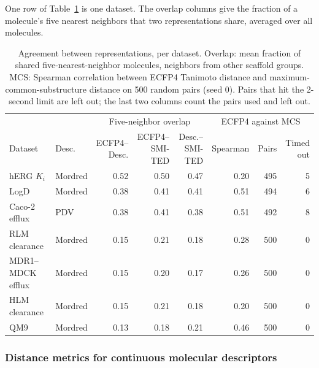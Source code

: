 One row of Table~\ref{tab:flaws:neighbor_overlap} is one dataset. The overlap columns give the fraction of a molecule's five nearest neighbors that two representations share, averaged over all molecules.

\begin{table}[t]
\centering
\small
\setlength{\tabcolsep}{4pt}
\caption[Agreement between representations per dataset.]{Agreement between representations, per dataset. Overlap: mean fraction of shared five-nearest-neighbor molecules, neighbors from other scaffold groups. MCS: Spearman correlation between ECFP4 Tanimoto distance and maximum-common-substructure distance on 500 random pairs (seed 0). Pairs that hit the 2-second limit are left out; the last two columns count the pairs used and left out.}
\label{tab:flaws:neighbor_overlap}
\begin{adjustbox}{max width=\textwidth}
\begin{tabular}{llrrrrrr}
\toprule
 & & \multicolumn{3}{c}{Five-neighbor overlap} & \multicolumn{3}{c}{ECFP4 against MCS} \\
\cmidrule(lr){3-5}\cmidrule(lr){6-8}
Dataset & Desc. & \makecell{ECFP4--\\Desc.} & \makecell{ECFP4--\\SMI-TED} & \makecell{Desc.--\\SMI-TED} & Spearman & Pairs & \makecell{Timed\\out} \\
\midrule
hERG $K_i$ & Mordred & 0.52 & 0.50 & 0.47 & 0.20 & 495 & 5 \\
LogD & Mordred & 0.38 & 0.41 & 0.41 & 0.51 & 494 & 6 \\
Caco-2 efflux & PDV & 0.38 & 0.41 & 0.38 & 0.51 & 492 & 8 \\
RLM clearance & Mordred & 0.15 & 0.21 & 0.18 & 0.28 & 500 & 0 \\
MDR1--MDCK efflux & Mordred & 0.15 & 0.20 & 0.17 & 0.26 & 500 & 0 \\
HLM clearance & Mordred & 0.15 & 0.21 & 0.18 & 0.20 & 500 & 0 \\
QM9 & Mordred & 0.13 & 0.18 & 0.21 & 0.46 & 500 & 0 \\
\bottomrule
\end{tabular}
\end{adjustbox}
\end{table}


\subsubsection{Distance metrics for continuous molecular descriptors}

